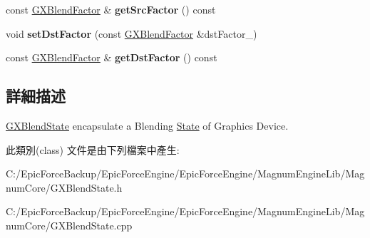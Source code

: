 \begin{DoxyCompactItemize}
\item 
const \hyperlink{class_magnum_1_1_g_x_blend_factor}{G\+X\+Blend\+Factor} \& {\bfseries get\+Src\+Factor} () const \hypertarget{class_magnum_1_1_g_x_blend_state_a2614e71b55ec56eb645473dc97ca06f2}{}\label{class_magnum_1_1_g_x_blend_state_a2614e71b55ec56eb645473dc97ca06f2}

\item 
void {\bfseries set\+Dst\+Factor} (const \hyperlink{class_magnum_1_1_g_x_blend_factor}{G\+X\+Blend\+Factor} \&dst\+Factor\+\_\+)\hypertarget{class_magnum_1_1_g_x_blend_state_a976c6ec32b463f8c3cb3966b85ea8646}{}\label{class_magnum_1_1_g_x_blend_state_a976c6ec32b463f8c3cb3966b85ea8646}

\item 
const \hyperlink{class_magnum_1_1_g_x_blend_factor}{G\+X\+Blend\+Factor} \& {\bfseries get\+Dst\+Factor} () const \hypertarget{class_magnum_1_1_g_x_blend_state_a4dbf580e9e9c47fb23314ed7747ac0fb}{}\label{class_magnum_1_1_g_x_blend_state_a4dbf580e9e9c47fb23314ed7747ac0fb}

\end{DoxyCompactItemize}


\subsection{詳細描述}
\hyperlink{class_magnum_1_1_g_x_blend_state}{G\+X\+Blend\+State} encapsulate a Blending \hyperlink{class_magnum_1_1_state}{State} of Graphics Device. 

此類別(class) 文件是由下列檔案中產生\+:\begin{DoxyCompactItemize}
\item 
C\+:/\+Epic\+Force\+Backup/\+Epic\+Force\+Engine/\+Epic\+Force\+Engine/\+Magnum\+Engine\+Lib/\+Magnum\+Core/G\+X\+Blend\+State.\+h\item 
C\+:/\+Epic\+Force\+Backup/\+Epic\+Force\+Engine/\+Epic\+Force\+Engine/\+Magnum\+Engine\+Lib/\+Magnum\+Core/G\+X\+Blend\+State.\+cpp\end{DoxyCompactItemize}
